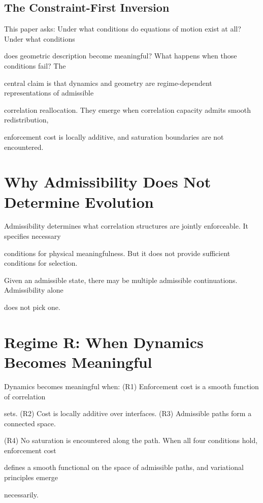 \documentclass[11pt]{article}
\begin{document}
\subsection{The Constraint-First Inversion}

This paper asks: Under what conditions do equations of motion exist at all? Under what conditions

does geometric description become meaningful? What happens when those conditions fail? The

central claim is that dynamics and geometry are regime-dependent representations of admissible

correlation reallocation. They emerge when correlation capacity admits smooth redistribution,

enforcement cost is locally additive, and saturation boundaries are not encountered.



\section{Why Admissibility Does Not Determine Evolution}

Admissibility determines what correlation structures are jointly enforceable. It specifies necessary

conditions for physical meaningfulness. But it does not provide sufficient conditions for selection.

Given an admissible state, there may be multiple admissible continuations. Admissibility alone

does not pick one.



\section{Regime R: When Dynamics Becomes Meaningful}

Dynamics becomes meaningful when: (R1) Enforcement cost is a smooth function of correlation

sets. (R2) Cost is locally additive over interfaces. (R3) Admissible paths form a connected space.

(R4) No saturation is encountered along the path. When all four conditions hold, enforcement cost

defines a smooth functional on the space of admissible paths, and variational principles emerge

necessarily.
\end{document}
